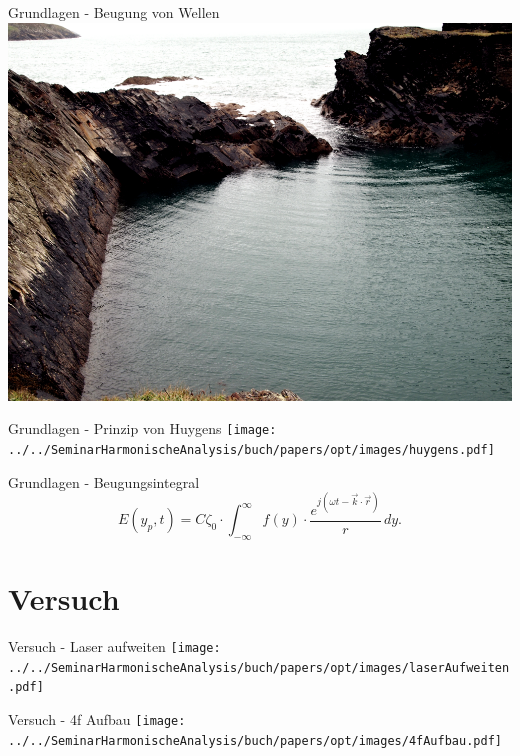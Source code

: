 \documentclass{beamer}
\begin{document}
\begin{frame}{Grundlagen - Beugung von Wellen}
    \centering
    \includegraphics[width=0.9\linewidth]{images/beugung_von_wasserwellen.png}
\end{frame}

\begin{frame}{Grundlagen - Prinzip von Huygens}
    \texttt{[image: ../../SeminarHarmonischeAnalysis/buch/papers/opt/images/huygens.pdf]}
\end{frame}

\begin{frame}{Grundlagen - Beugungsintegral}
    \begin{equation*}
        E(y_p, t)
        =
        C\zeta_0 \cdot \int_{-\infty}^{\infty}f(y)\cdot\frac{e^{j(\omega t - \vec{k}\cdot\vec{r})}}{r} \,dy
        .
    \end{equation*}
\end{frame}

\section{Versuch}

\begin{frame}{Versuch - Laser aufweiten}
    \centering
    \texttt{[image: ../../SeminarHarmonischeAnalysis/buch/papers/opt/images/laserAufweiten.pdf]}
\end{frame}

\begin{frame}{Versuch - 4f Aufbau}
    \texttt{[image: ../../SeminarHarmonischeAnalysis/buch/papers/opt/images/4fAufbau.pdf]}
\end{frame}
\end{document}
